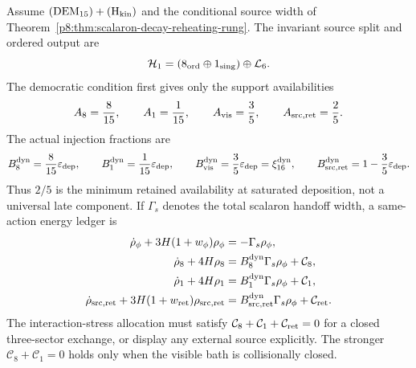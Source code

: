 \documentclass[12pt,a4paper]{article}
\begin{document}
\begin{theorem}
\label{p8:thm:sector-resolved-first-split-reheating}
Assume \((\mathrm{DEM}_{15})+(\mathrm H_{\rm kin})\) and the conditional
source width of Theorem~\ref{p8:thm:scalaron-decay-reheating-rung}.  The
invariant source split and ordered output are
\[
 \mathcal H_1=(8_{\rm ord}\oplus1_{\rm sing})\oplus\mathcal L_6.
\]
The democratic condition first gives only the support availabilities
\begin{equation}
\label{p8:eq:sector-reheating-fractions}
A_{8}=\frac{8}{15},\qquad
A_{1}=\frac{1}{15},\qquad
A_{\rm vis}=\frac35,
\qquad A_{\rm src,ret}=\frac25.
\end{equation}
The actual injection fractions are
\begin{equation}
\label{p8:eq:sector-dynamical-injection-fractions}
B_8^{\rm dyn}=\frac8{15}\varepsilon_{\rm dep},\qquad
B_1^{\rm dyn}=\frac1{15}\varepsilon_{\rm dep},\qquad
B_{\rm vis}^{\rm dyn}=\frac35\varepsilon_{\rm dep}
=\xi_{16}^{\rm dyn},\qquad
B_{\rm src,ret}^{\rm dyn}=1-\frac35\varepsilon_{\rm dep}.
\end{equation}
Thus \(2/5\) is the minimum retained availability at saturated deposition,
not a universal late component.  If \(\Gamma_s\) denotes the total scalaron
handoff width, a same-action energy ledger is
\begin{align}
\dot\rho_\phi+3H(1+w_\phi)\rho_\phi
 &=-\Gamma_s\rho_\phi,\label{p8:eq:sector-rho-phi}\\
\dot\rho_8+4H\rho_8
 &=B_8^{\rm dyn}\Gamma_s\rho_\phi+\mathcal C_{8},\label{p8:eq:sector-rho-8}\\
\dot\rho_1+4H\rho_1
 &=B_1^{\rm dyn}\Gamma_s\rho_\phi+\mathcal C_{1},\label{p8:eq:sector-rho-1}\\
\dot\rho_{\rm src,ret}+3H(1+w_{\rm ret})\rho_{\rm src,ret}
 &=B_{\rm src,ret}^{\rm dyn}\Gamma_s\rho_\phi
   +\mathcal C_{\rm ret}.\label{p8:eq:sector-rho-rem}
\end{align}
The interaction-stress allocation must satisfy
\(\mathcal C_8+\mathcal C_1+\mathcal C_{\rm ret}=0\) for a closed
three-sector exchange, or display any external source explicitly.  The
stronger \(\mathcal C_8+\mathcal C_1=0\) holds only when the visible bath is
collisionally closed.


\end{theorem}
\end{document}
